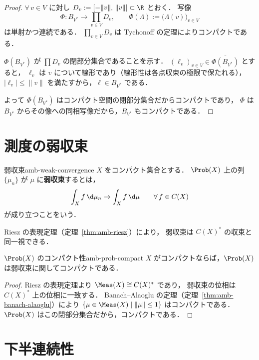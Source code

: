 \begin{proof}
  $\forall\, v \in V$ に対し $D_v := [-\|v\|,\, \|v\|] \subset \R$ とおく．
  写像
  \[
    \Phi \colon B_{V^*} \to \prod_{v \in V} D_v, \qquad
    \Phi(\Lambda) := \bigl(\Lambda(v)\bigr)_{v \in V}
  \]
  は単射かつ連続である．
  $\prod_{v \in V} D_v$ は Tychonoff の定理によりコンパクトである．

  $\Phi(B_{V^*})$ が $\prod D_v$ の閉部分集合であることを示す．
  $(\ell_v)_{v \in V} \in \overline{\Phi(B_{V^*})}$ とすると，
  $\ell_v$ は $v$ について線形であり（線形性は各点収束の極限で保たれる），
  $|\ell_v| \leq \|v\|$ を満たすから，$\ell \in B_{V^*}$ である．

  よって $\Phi(B_{V^*})$ はコンパクト空間の閉部分集合だからコンパクトであり，
  $\Phi$ は $B_{V^*}$ からその像への同相写像だから，$B_{V^*}$ もコンパクトである．
\end{proof}

\section{測度の弱収束}
\label{sec:weak-convergence}

\begin{definition}{弱収束}{amb-weak-convergence}
  $X$ をコンパクト集合とする．
  $\Prob(X)$ 上の列 $\{\mu_n\}$ が $\mu$ に\textbf{弱収束}するとは，
  \[
    \int_X f\,\d\mu_n \to \int_X f\,\d\mu
    \qquad \forall\, f \in C(X)
  \]
  が成り立つことをいう．
\end{definition}

Riesz の表現定理（定理~\ref{thm:amb-riesz}）により，
弱収束は $C(X)^*$ の収束と同一視できる．

\begin{theorem}{$\Prob(X)$ のコンパクト性}{amb-prob-compact}
  $X$ がコンパクトならば，$\Prob(X)$ は弱収束に関してコンパクトである．
\end{theorem}

\begin{proof}
  Riesz の表現定理より $\Meas(X) \cong C(X)^*$ であり，
  弱収束の位相は $C(X)^*$ 上の位相に一致する．
  Banach–Alaoglu の定理（定理~\ref{thm:amb-banach-alaoglu}）により
  $\{\mu \in \Meas(X) \mid \|\mu\| \leq 1\}$ はコンパクトである．
  $\Prob(X)$ はこの閉部分集合だから，コンパクトである．
\end{proof}

\section{下半連続性}
\label{sec:lsc}

